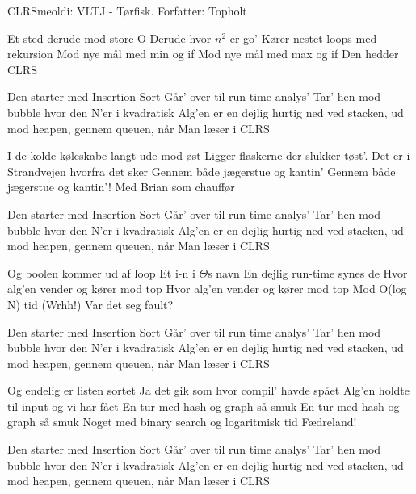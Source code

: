 \begin{sang}{CLRS}{meoldi: VLTJ - Tørfisk. Forfatter: Topholt}
    \begin{vers}
    Et sted derude mod store O
    Derude hvor $n^2$ er go'
    Kører nestet loops med rekursion
    Mod nye mål med min og if
    Mod nye mål med max og if
    Den hedder CLRS
    \end{vers}
    
    \begin{omkvaed}
    Den starter med Insertion Sort
    Går' over til run time analys' 
    Tar' hen mod bubble hvor den N'er i kvadratisk
    Alg'en er en dejlig hurtig ned ved stacken, ud mod heapen, gennem queuen, når
    Man læser i CLRS
    \end{omkvaed}
    
    \begin{vers}
    I de kolde køleskabe langt ude mod øst
    Ligger flaskerne der slukker tøst'.
    Det er i Strandvejen hvorfra det sker
    Gennem både jægerstue og kantin'
    Gennem både jægerstue og kantin'!
    Med Brian som chauffør
    \end{vers}
    
    \begin{omkvaed}
    Den starter med Insertion Sort
    Går' over til run time analys' 
    Tar' hen mod bubble hvor den N'er i kvadratisk
    Alg'en er en dejlig hurtig ned ved stacken, ud mod heapen, gennem queuen, når
    Man læser i CLRS
    \end{omkvaed}
    
    \begin{vers}
    Og boolen kommer ud af loop
    Et i-n i $\Theta$s navn
    En dejlig run-time synes de
    Hvor alg'en vender og kører mod top
    Hvor alg'en vender og kører mod top
    Mod O(log N) tid (Wrhh!)
    Var det seg fault?
    \end{vers}
    
    \begin{omkvaed}
    Den starter med Insertion Sort
    Går' over til run time analys' 
    Tar' hen mod bubble hvor den N'er i kvadratisk
    Alg'en er en dejlig hurtig ned ved stacken, ud mod heapen, gennem queuen, når
    Man læser i CLRS
    \end{omkvaed}

    \begin{vers}
    Og endelig er listen sortet
    Ja det gik som hvor compil' havde spået
    Alg'en holdte til input og vi har fået
    En tur med hash og graph så smuk
    En tur med hash og graph så smuk
    Noget med binary search og logaritmisk tid
    Fædreland!
    \end{vers}
        
    \begin{omkvaed}
    Den starter med Insertion Sort
    Går' over til run time analys' 
    Tar' hen mod bubble hvor den N'er i kvadratisk
    Alg'en er en dejlig hurtig ned ved stacken, ud mod heapen, gennem queuen, når
    Man læser i CLRS
    \end{omkvaed}

    \end{sang}